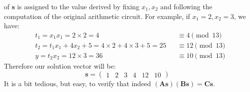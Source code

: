 \begin{example}
	of \(\bm{s}\) is assigned to the value derived by fixing \(x_1, x_2\) and following the
	computation of the original arithmetic circuit.
	For example, if \(x_1 = 2, x_2 = 3\), we have:
	\begin{align*}
		 & t_1 = x_1x_1 = 2 \times 2 = 4                              &  & \equiv  4  \pmod{13} \\
		 & t_2 = t_1x_1 + 4x_2 + 5 = 4 \times 2 + 4 \times 3 + 5 = 25 &  & \equiv 12 \pmod{13}  \\
		 & y = t_2x_2 = 12 \times 3 = 36                              &  & \equiv 10 \pmod{13}
	\end{align*}
	Therefore our solution vector will be:
	\[\bm{s} = \begin{pmatrix}1 & 2 & 3 & 4 & 12 & 10\end{pmatrix} \]
	It is a bit tedious, but easy, to verify that indeed
	\(\left(\bm{A}\bm{s}\right)\left(\bm{B}\bm{s}\right) = \bm{C}\bm{s}\).
\end{example}
